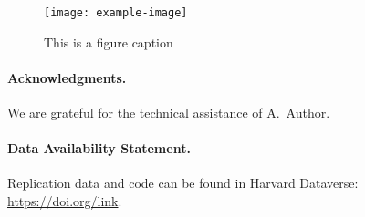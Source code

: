 \documentclass{cup-pan}
\begin{document}
\begin{figure}
\centering
\texttt{[image: example-image]}
\caption{This is a figure caption}
\label{fig:landscape}
\end{figure}

\blinddocument

\bigskip

\paragraph*{Acknowledgments.} We are grateful for the technical assistance of A.~Author.

\paragraph*{Data Availability Statement.} Replication data and code can be found in Harvard Dataverse: \url{https://doi.org/link}.

\nocite{*}
\printbibliography
\end{document}

